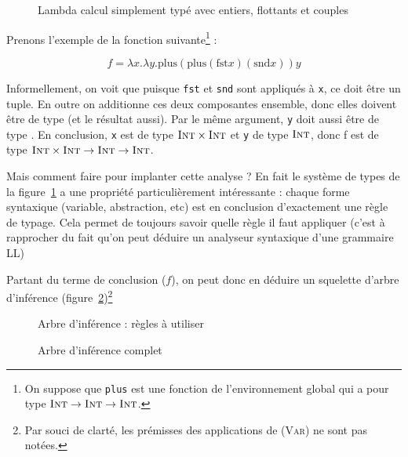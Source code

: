 \begin{figure}



\caption{Lambda calcul simplement typé avec entiers, flottants et couples}
\label{fig:stlc}

\end{figure}

Prenons l'exemple de la fonction suivante\footnote{ On suppose que \texttt{plus}
est une fonction de l'environnement global qui a pour type $\textsc{Int} \rightarrow
\textsc{Int} \rightarrow \textsc{Int}$.} :

\[
f = λx.λy. \textrm{plus} (\textrm{plus} (\textrm{fst} x) (\textrm{snd} x)) y
\]

Informellement, on voit que puisque \texttt{fst} et \texttt{snd} sont appliqués
à \texttt{x}, ce doit être un tuple. En outre on additionne ces deux composantes
ensemble, donc elles doivent être de type \tInt (et le résultat aussi). Par le
même argument, \texttt{y} doit aussi être de type \tInt. En conclusion,
\texttt{x} est de type $\textsc{Int} \times \textsc{Int}$ et \texttt{y} de type $\textsc{Int}$, donc
f est de type $\textsc{Int} \times \textsc{Int} \rightarrow \textsc{Int} \rightarrow \textsc{Int}$.

Mais comment faire pour implanter cette analyse ? En fait le système de types de
la figure~\ref{fig:stlc} a une propriété particulièrement intéressante : chaque
forme syntaxique (variable, abstraction, etc) est en conclusion d'exactement une
règle de typage. Cela permet de toujours savoir quelle règle il faut appliquer
(c'est à rapprocher du fait qu'on peut déduire un analyseur syntaxique d'une
grammaire LL)

Partant du terme de conclusion ($f$), on peut donc en déduire un squelette
d'arbre d'inférence (figure~\ref{fig:inftree-rules})\footnote{Par souci de
clarté, les prémisses des applications de \textsc{(Var)} ne sont pas notées.}

\begin{figure} %
\def\disptypeL#1{}
\def\disptypeR#1{}



\caption{Arbre d'inférence : règles à utiliser}
\label{fig:inftree-rules}
\end{figure} %

\begin{figure} %
\def\disptypeL#1{:#1}
\def\disptypeR#1{:#1}



\caption{Arbre d'inférence complet}
\label{fig:inftree-full}
\end{figure} %

